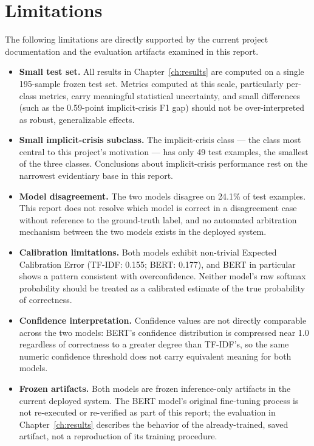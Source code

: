 \chapter{Limitations}
\label{ch:limitations}

The following limitations are directly supported by the current project documentation and the evaluation artifacts examined in this report.

\begin{itemize}[nosep,leftmargin=*]
  \item \textbf{Small test set.} All results in Chapter~\ref{ch:results} are computed on a single 195-sample frozen test set. Metrics computed at this scale, particularly per-class metrics, carry meaningful statistical uncertainty, and small differences (such as the 0.59-point implicit-crisis F1 gap) should not be over-interpreted as robust, generalizable effects.

  \item \textbf{Small implicit-crisis subclass.} The implicit-crisis class --- the class most central to this project's motivation --- has only 49 test examples, the smallest of the three classes. Conclusions about implicit-crisis performance rest on the narrowest evidentiary base in this report.

  \item \textbf{Model disagreement.} The two models disagree on 24.1\% of test examples. This report does not resolve which model is correct in a disagreement case without reference to the ground-truth label, and no automated arbitration mechanism between the two models exists in the deployed system.

  \item \textbf{Calibration limitations.} Both models exhibit non-trivial Expected Calibration Error (TF-IDF: 0.155; BERT: 0.177), and BERT in particular shows a pattern consistent with overconfidence. Neither model's raw softmax probability should be treated as a calibrated estimate of the true probability of correctness.

  \item \textbf{Confidence interpretation.} Confidence values are not directly comparable across the two models: BERT's confidence distribution is compressed near 1.0 regardless of correctness to a greater degree than TF-IDF's, so the same numeric confidence threshold does not carry equivalent meaning for both models.

  \item \textbf{Frozen artifacts.} Both models are frozen inference-only artifacts in the current deployed system. The BERT model's original fine-tuning process is not re-executed or re-verified as part of this report; the evaluation in Chapter~\ref{ch:results} describes the behavior of the already-trained, saved artifact, not a reproduction of its training procedure.


\end{itemize}

